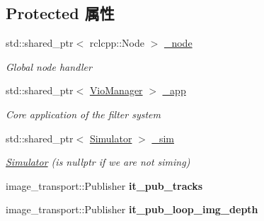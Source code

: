 \subsection*{Protected 属性}
\begin{DoxyCompactItemize}
\item 
\mbox{\label{classov__msckf_1_1ROS2Visualizer_aad482388407009f1bdacd886d9a7d74c}} 
std\+::shared\+\_\+ptr$<$ rclcpp\+::\+Node $>$ \hyperlink{classov__msckf_1_1ROS2Visualizer_aad482388407009f1bdacd886d9a7d74c}{\+\_\+node}
\begin{DoxyCompactList}\small\item\em Global node handler \end{DoxyCompactList}\item 
\mbox{\label{classov__msckf_1_1ROS2Visualizer_a1586e2d19475d770bb83405d04218941}} 
std\+::shared\+\_\+ptr$<$ \hyperlink{classov__msckf_1_1VioManager}{Vio\+Manager} $>$ \hyperlink{classov__msckf_1_1ROS2Visualizer_a1586e2d19475d770bb83405d04218941}{\+\_\+app}
\begin{DoxyCompactList}\small\item\em Core application of the filter system \end{DoxyCompactList}\item 
\mbox{\label{classov__msckf_1_1ROS2Visualizer_af343bba4d35f89ebe2d28943bc82cced}} 
std\+::shared\+\_\+ptr$<$ \hyperlink{classov__msckf_1_1Simulator}{Simulator} $>$ \hyperlink{classov__msckf_1_1ROS2Visualizer_af343bba4d35f89ebe2d28943bc82cced}{\+\_\+sim}
\begin{DoxyCompactList}\small\item\em \hyperlink{classov__msckf_1_1Simulator}{Simulator} (is nullptr if we are not sim\textquotesingle{}ing) \end{DoxyCompactList}\item 
\mbox{\label{classov__msckf_1_1ROS2Visualizer_a023a013d608f5c90b44f4fb87e7ce4d8}} 
image\+\_\+transport\+::\+Publisher {\bfseries it\+\_\+pub\+\_\+tracks}
\item 
\mbox{\label{classov__msckf_1_1ROS2Visualizer_a73e2203bc1860cd53ecdb172318692e6}} 
image\+\_\+transport\+::\+Publisher {\bfseries it\+\_\+pub\+\_\+loop\+\_\+img\+\_\+depth}

\end{DoxyCompactItemize}
